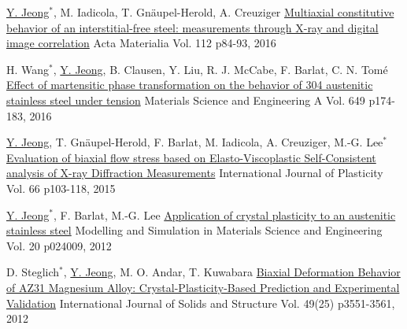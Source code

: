 \begin{cventries}
  \cventry
  {\underline{Y. Jeong}$^*$, M. Iadicola, T. Gn\"{a}upel-Herold, A. Creuziger}
  {\href{http://dx.doi.org/10.1016/j.actamat.2016.04.013}{Multiaxial constitutive behavior of an interstitial-free steel: measurements through X-ray and digital image correlation}}
  {Acta Materialia }
  {Vol. 112 p84-93, 2016}
  {
  }


  \cventry
  {H. Wang$^*$, \underline{Y. Jeong}, B. Clausen, Y. Liu, R. J. McCabe, F. Barlat, C. N. Tom\'{e}}
  {\href{http://dx.doi.org/10.1016/j.msea.2015.09.108}{Effect of martensitic phase transformation on the behavior of 304 austenitic stainless steel under tension}}
  {Materials Science and Engineering A }
  {Vol. 649 p174-183, 2016}
  {
  }

  \cventry
  {\underline{Y. Jeong}, T. Gn\"{a}upel-Herold, F. Barlat, M. Iadicola, A. Creuziger, M.-G. Lee$^*$}
  {\href{http://dx.doi.org/10.1016/j.ijplas.2014.06.009}{Evaluation of biaxial flow stress based on Elasto-Viscoplastic Self-Consistent analysis of X-ray Diffraction Measurements}}
  {International Journal of Plasticity}
  {Vol. 66 p103-118, 2015}
  {
  }

  \cventry
  {\underline{Y. Jeong}$^*$, F. Barlat, M.-G. Lee}
  {\href{http://dx.doi.org/10.1088/0965-0393/20/2/024009}{Application of crystal plasticity to an austenitic stainless steel}}
  {Modelling and Simulation in Materials Science and Engineering}
  {Vol. 20 p024009, 2012}
  {
  }

  \cventry
  {D. Steglich$^*$, \underline{Y. Jeong}, M. O. Andar, T. Kuwabara}
  {\href{http://dx.doi.org/10.1016/j.ijsolstr.2012.06.017}{Biaxial Deformation Behavior of AZ31 Magnesium Alloy: Crystal-Plasticity-Based Prediction and Experimental Validation}}
  {International Journal of Solids and Structure}
  {Vol. 49(25) p3551-3561, 2012}
  {
  }
\item

\end{cventries}




